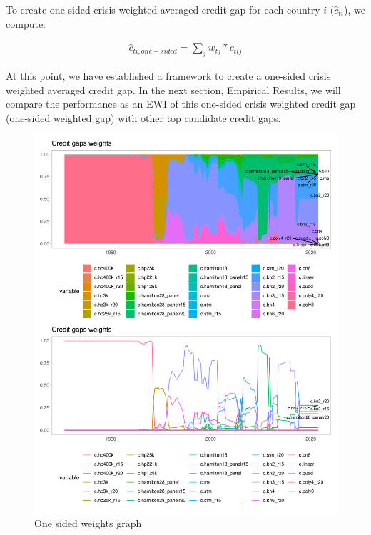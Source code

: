 \documentclass[
  12pt,
]{article}
\begin{document}
To create one-sided crisis weighted averaged credit gap for each country \(i\) (\(\hat{c}_{ti}\)), we compute:

\begin{align}
\hat{c}_{ti,one-sided} = \sum\nolimits_{j} w_{tj} * c_{tij}
\end{align}

At this point, we have established a framework to create a one-sided crisis weighted averaged credit gap. In the next section, Empirical Results, we will compare the performance as an EWI of this one-sided crisis weighted credit gap (one-sided weighted gap) with other top candidate credit gaps.

\begin{figure}

{\centering \includegraphics[width=1\linewidth]{../Data/Output/Graphs/Weights_combined} 

}

\caption{One sided weights graph}\label{fig:weightgraph}
\end{figure}
\end{document}
